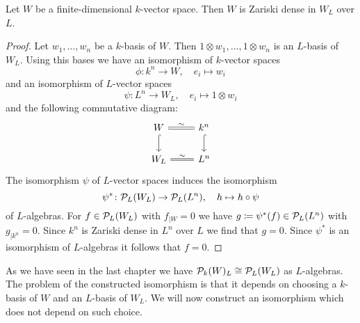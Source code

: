\begin{lemma}\label{lemma: W Zariski dense in W_L}
  Let $W$ be a finite-dimensional $k$-vector space.
  Then $W$ is Zariski dense in $W_L$ over $L$.
\end{lemma}
\begin{proof}
  Let $w_1, \dotsc, w_n$ be a $k$-basis of $W$.
  Then $1 \otimes w_1, \dotsc, 1 \otimes w_n$ is an $L$-basis of $W_L$.
  Using this bases we have an isomorphism of $k$-vector spaces
  \[
            \phi
    \colon  k^n \to W,
    \quad   e_i
    \mapsto w_i
  \]
  and an isomorphism of $L$-vector spaces
  \[
            \psi
    \colon  L^n
    \to     W_L,
    \quad   e_i
    \mapsto 1 \otimes w_i
  \]
  and the following commutative diagram:
  \[
    \begin{tikzcd}
        W
        \arrow[equal]{r}{\sim}
        \arrow[hook]{d}
      & k^n
        \arrow[hook]{d}
      \\
        W_L
        \arrow[equal]{r}{\sim}
      & L^n
    \end{tikzcd}
  \]
  The isomorphism $\psi$ of $L$-vector spaces induces the isomorphism
  \[
            \psi^*
    \colon  \mathcal{P}_L(W_L)
    \to     \mathcal{P}_L(L^n),
    \quad   h
    \mapsto h \circ \psi
  \]
  of $L$-algebras.
  For $f \in \mathcal{P}_L(W_L)$ with $f_{|W} = 0$ we have $g \coloneqq \psi^*(f) \in \mathcal{P}_L(L^n)$ with $g_{|k^n} = 0$.
  Since $k^n$ is Zariski dense in $L^n$ over $L$ we find that $g = 0$.
  Since $\psi^*$ is an isomorphism of $L$-algebras it follows that $f = 0$.
\end{proof}


As we have seen in the last chapter we have $\mathcal{P}_k(W)_L \cong \mathcal{P}_L(W_L)$ as $L$-algebras.
The problem of the constructed isomorphism is that it depends on choosing a $k$-basis of $W$ and an $L$-basis of $W_L$.
We will now construct an isomorphism which does not depend on such choice.


